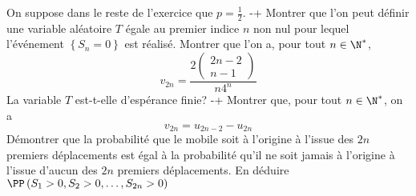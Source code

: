 \begin{exercise}[title=Marche aléatoire dans $\mathbb{Z}:$ premier retour à l'origine]
On suppose dans le reste de l'exercice que $p=\frac{1}{2}$.
\question-\question+ Montrer que l'on peut définir une variable aléatoire $T$ égale au premier indice $n$ non nul pour lequel l'événement $\left\{S_{n}=0\right\}$ est réalisé.
\question Montrer que l'on a, pour tout $n \in \N^{*}$,
\begin{equation*}
v_{2 n}=\frac{2\left(\begin{array}{c}
2 n-2 \\
n-1
\end{array}\right)}{n 4^{n}}
\end{equation*}
\question La variable $T$ est-t-elle d'espérance finie?
\question-\question+  Montrer que, pour tout $n \in \N^{*}$, on a
\begin{equation*}
v_{2 n}=u_{2 n-2}-u_{2 n}
\end{equation*}
\question Démontrer que la probabilité que le mobile soit à l'origine à l'issue des $2 n$ premiers déplacements est égal à la probabilité qu'il ne soit jamais à l'origine à l'issue d'aucun des $2 n$ premiers déplacements. En déduire $\PP\left(S_{1}>0, S_{2}>0, \ldots, S_{2 n}>0\right)$
\endquestions 
\end{exercise}


